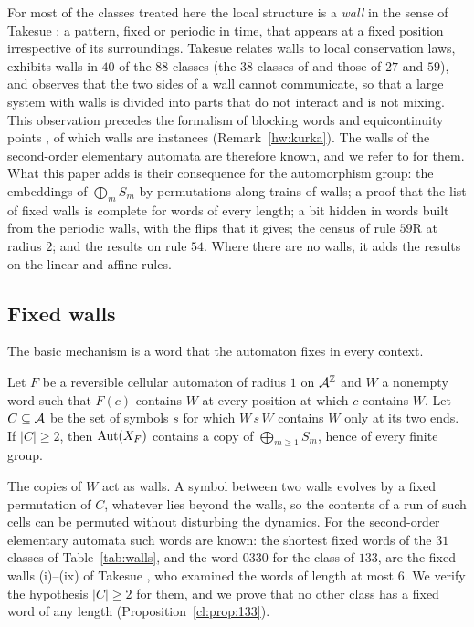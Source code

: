 For most of the classes treated here the local structure is a \emph{wall} in the sense of Takesue \cite[Section~4]{Takesue1989}: a pattern, fixed or periodic in time, that appears at a fixed position irrespective of its surroundings. Takesue relates walls to local conservation laws, exhibits walls in $40$ of the $88$ classes (the $38$ classes of \cite[Fig.~2, Table~III]{Takesue1989} and those of $27$ and $59$), and observes that the two sides of a wall cannot communicate, so that a large system with walls is divided into parts that do not interact and is not mixing. This observation precedes the formalism of blocking words and equicontinuity points \cite{Kurka1997,BT2000}, of which walls are instances (Remark~\ref{hw:kurka}). The walls of the second-order elementary automata are therefore known, and we refer to \cite{Takesue1989} for them. What this paper adds is their consequence for the automorphism group: the embeddings of $\bigoplus_mS_m$ by permutations along trains of walls; a proof that the list of fixed walls is complete for words of every length; a bit hidden in words built from the periodic walls, with the flips that it gives; the census of rule $59$R at radius $2$; and the results on rule $54$. Where there are no walls, it adds the results on the linear and affine rules.

\subsection*{Fixed walls}
The basic mechanism is a word that the automaton fixes in every context.

\begin{theorem}\label{thm:walls}
Let $F$ be a reversible cellular automaton of radius $1$ on $\mathcal{A}^{\mathbb{Z}}$ and $W$ a nonempty word such that $F(c)$ contains $W$ at every position at which $c$ contains $W$. Let $C\subseteq\mathcal{A}$ be the set of symbols $s$ for which $W\,s\,W$ contains $W$ only at its two ends. If $|C|\ge2$, then $\operatorname{Aut}(X_F)$ contains a copy of $\bigoplus_{m\ge1}S_m$, hence of every finite group.
\end{theorem}

The copies of $W$ act as walls. A symbol between two walls evolves by a fixed permutation of $C$, whatever lies beyond the walls, so the contents of a run of such cells can be permuted without disturbing the dynamics. For the second-order elementary automata such words are known: the shortest fixed words of the $31$ classes of Table~\ref{tab:walls}, and the word $0330$ for the class of $133$, are the fixed walls (i)--(ix) of Takesue \cite[Fig.~2, Table~III and p.~391]{Takesue1989}, who examined the words of length at most $6$. We verify the hypothesis $|C|\ge2$ for them, and we prove that no other class has a fixed word of any length (Proposition~\ref{cl:prop:133}).

